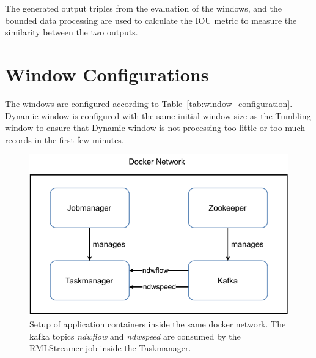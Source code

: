 The generated output triples from the evaluation of the windows, and the bounded data processing are 
used to calculate the IOU metric to measure the similarity between the two outputs.    


\section{Window Configurations}
\label{sec:Window Configurations}
The windows are configured according to Table~\ref{tab:window_configuration}. 
Dynamic window is configured with the same initial window size as the 
Tumbling window to ensure that Dynamic window is not processing too little or too much 
records in the first few minutes. 


\begin{figure}[htpb]
    \centering
    \includegraphics[width=0.8\linewidth]{fig/docker_setup.pdf}
    \caption{Setup of application containers inside the same docker network. 
    The kafka topics \emph{ndwflow} and \emph{ndwspeed} are consumed by the 
RMLStreamer job inside the Taskmanager. 
}%
    \label{fig:docker_setup}
\end{figure}

